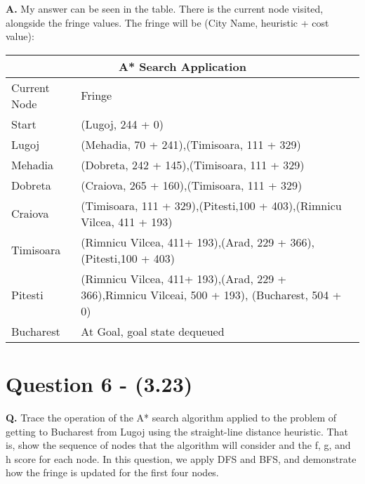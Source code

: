 \documentclass[12pt]{amsart}
\begin{document}
\textbf{A.} My answer can be seen in the table. There is the current node visited, alongside the fringe values. The fringe will be (City Name, heuristic + cost value):\hfill \break 
\begin{tabular}{ |p{1.7cm}||p{14.5cm}| }
 \hline
 \multicolumn{2}{|c|}{A* Search Application} \\
 \hline
Current Node & Fringe \\
 \hline
Start   & {(Lugoj, 244 + 0)} \\
Lugoj &   {(Mehadia, 70 + 241),(Timisoara, 111 + 329)}  \\
Mehadia & {(Dobreta, 242 + 145),(Timisoara, 111 + 329)}  \\
Dobreta   & {(Craiova, 265 + 160),(Timisoara, 111 + 329)} \\
Craiova &   {(Timisoara, 111 + 329),(Pitesti,100 + 403),(Rimnicu Vilcea, 411 + 193)}  \\
Timisoara & {(Rimnicu Vilcea, 411+ 193),(Arad, 229 + 366),(Pitesti,100 + 403)}  \\
Pitesti & {(Rimnicu Vilcea, 411+ 193),(Arad, 229 + 366),Rimnicu Vilceai, 500 + 193), (Bucharest, 504 + 0)}  \\
Bucharest & At Goal, goal state dequeued \\
 \hline
\end{tabular}
\hfill \break

\section*{Question 6 - (3.23)}
\textbf{Q.} Trace the operation of the A* search algorithm applied to the problem of getting to Bucharest from Lugoj using the straight-line distance heuristic. That is, show the sequence of nodes that the algorithm will consider and the f, g, and h score for each node. In this question, we apply DFS and BFS, and demonstrate how the fringe is updated for the first four nodes.  \hfill \break
\end{document}
